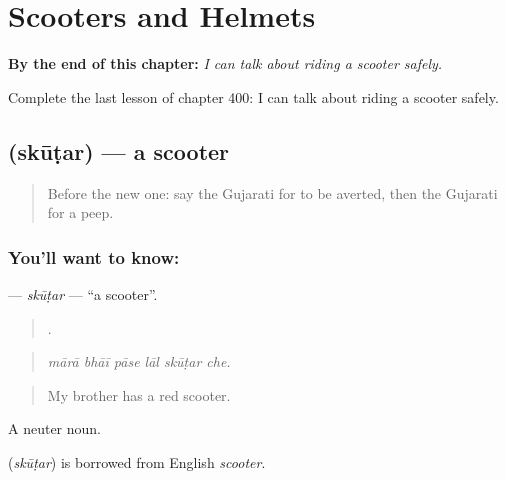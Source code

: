 
\chapter{Scooters and Helmets}
\label{ch:gu-scooters-and-helmets}

\begin{chapteropening}
\textbf{By the end of this chapter:} \emph{I can talk about riding a scooter safely.}

Complete the last lesson of chapter 400: I can talk about riding a scooter safely.
\end{chapteropening}

\section[\texorpdfstring{\gu{સ્કૂટર} (skūṭar)}{સ્કૂટર (skūṭar)}]{ (skūṭar) — a scooter}

\label{lesson:GU-C400-skutar}



\begin{quote}
Before the new one: say the Gujarati for to be averted, then the Gujarati for a peep.
\end{quote}

\subsection*{You'll want to know: }
\textbf{} — \emph{skūṭar} — \textquotedblleft{}a scooter\textquotedblright{}.

\begin{quote}
     .
\end{quote}

\begin{quote}
\emph{mārā bhāī pāse lāl skūṭar che.}
\end{quote}

\begin{quote}
My brother has a red scooter.
\end{quote}

A neuter noun.

\begin{cousinweb}
\textbf{} (\emph{skūṭar}) is borrowed from English \emph{scooter}.
\end{cousinweb}

